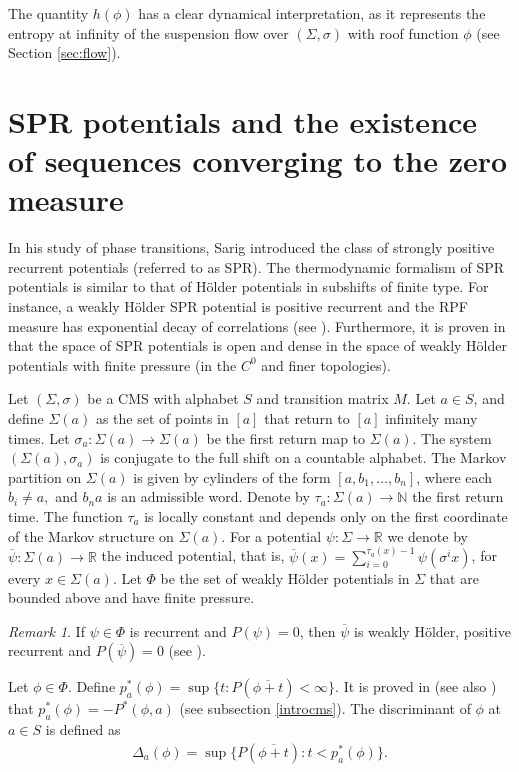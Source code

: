 \documentclass[letterpaper,11pt]{amsart}
\theoremstyle{plain}
\theoremstyle{plain}
\theoremstyle{definition}
\theoremstyle{remark}
\newtheorem{remark}{Remark}[section]
\def\R{{\mathbb R}}
\def\N{{\mathbb N}}
\begin{document}
The quantity $h(\phi)$ has a clear dynamical interpretation, as it represents the entropy at infinity of the suspension flow over $(\Sigma,\sigma)$ with roof function $\phi$ (see Section \ref{sec:flow}).




\section{SPR potentials and the existence of sequences converging to the zero measure}\label{sec:spr} In his study of phase transitions, Sarig \cite{sa2} introduced the class of strongly positive recurrent potentials (referred to as SPR). The thermodynamic formalism of SPR potentials is similar to that of H\"older potentials in subshifts of finite type. For instance, a weakly H\"older SPR potential  is positive recurrent and the RPF measure has exponential decay of correlations (see \cite{sa2, cs}). Furthermore, it is proven in \cite[Theorem 2.2]{cs} that the space of SPR potentials is open and dense in the space of weakly H\"older potentials with finite pressure (in the $C^0$ and finer topologies). 

Let $(\Sigma,\sigma)$ be a CMS with alphabet $S$ and transition matrix $M$. Let $a\in S$, and define $\Sigma(a)$ as the set of points in $[a]$ that return to $[a]$ infinitely many times. Let $\sigma_a:\Sigma(a)\to\Sigma(a)$ be the first return map to $\Sigma(a)$. The system $(\Sigma(a),\sigma_a)$ is conjugate to the full shift on a countable alphabet. The Markov partition on $\Sigma(a)$ is given by  cylinders of the form $[a,b_1,\ldots,b_n]$, where each $b_i\ne a,$ and $b_na$ is an admissible word. Denote by $\tau_a:\Sigma(a)\to \N$ the first return time. The function $\tau_a$ is locally constant and depends only on the first coordinate of the Markov structure on $\Sigma(a)$. For a potential $\psi:\Sigma\to\R$ we denote by $\overline{\psi}:\Sigma(a)\to\R$ the induced potential, that is, $\overline{\psi}(x)=\sum_{i=0}^{\tau_a(x)-1}\psi(\sigma^i x)$, for every $x\in \Sigma(a)$. Let $\Phi$ be the set of weakly H\"older potentials in $\Sigma$ that are bounded above and have finite pressure. 

\begin{remark}\label{rem:induce0}
If $\psi\in \Phi$ is recurrent and $P(\psi)=0$, then $\overline{\psi}$ is weakly H\"older, positive recurrent and $P(\overline{\psi})=0$ (see \cite[Lemma 3]{sa2}).
\end{remark}

Let  $\phi\in \Phi$. Define $p_a^*(\phi)=\sup\{t:P(\overline{\phi+t})<\infty\}.$ It is proved in \cite{sa2} (see also \cite[Section 7.3]{cs}) that $p_a^*(\phi)=-P^*(\phi,a)$ (see subsection \ref{introcms}). The discriminant of $\phi$ at $a\in S$ is defined as
\begin{align}\label{discriminant}\Delta_a(\phi)=\sup\{P(\overline{\phi+t}): t<p_a^*(\phi)\}.\end{align}
\end{document}
